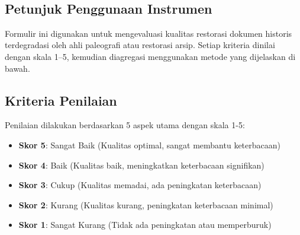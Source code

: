 
\label{lampiran:C}
\setcounter{table}{0}
\renewcommand{\thetable}{C.\arabic{table}}


\vspace{1cm}
\\[0.5em]

\vspace{1em}


\subsection*{Petunjuk Penggunaan Instrumen}

Formulir ini digunakan untuk mengevaluasi kualitas restorasi dokumen historis terdegradasi oleh ahli paleografi atau restorasi arsip. Setiap kriteria dinilai dengan skala 1--5, kemudian diagregasi menggunakan metode yang dijelaskan di bawah. 


\vspace{2em}


\subsection*{Kriteria Penilaian}

Penilaian dilakukan berdasarkan 5 aspek utama dengan skala 1-5:
\begin{itemize}[leftmargin=*, itemsep=0pt]
    \item \textbf{Skor 5}: Sangat Baik (Kualitas optimal, sangat membantu keterbacaan)
    \item \textbf{Skor 4}: Baik (Kualitas baik, meningkatkan keterbacaan signifikan)
    \item \textbf{Skor 3}: Cukup (Kualitas memadai, ada peningkatan keterbacaan)
    \item \textbf{Skor 2}: Kurang (Kualitas kurang, peningkatan keterbacaan minimal)
    \item \textbf{Skor 1}: Sangat Kurang (Tidak ada peningkatan atau memperburuk)
\end{itemize}
\vspace{0.5em}

